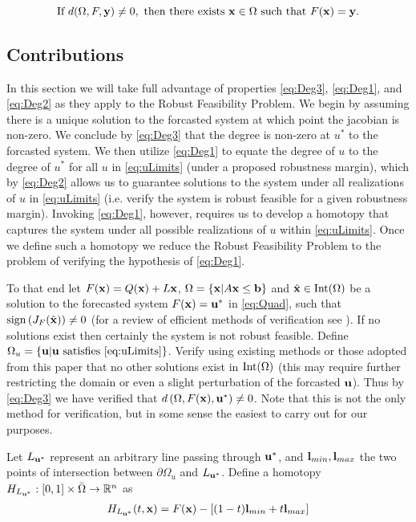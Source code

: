 \begin{equation}\label{eq:Deg2}
\text{If }d(\Omega,F,\mathbf{y})\neq 0,\text{ then there exists }\mathbf{x}\in\Omega\text{ such that }F(\mathbf{x})=\mathbf{y}. 
\end{equation}

\subsection{Contributions}
In this section we will take full advantage of properties \ref{eq:Deg3}, \ref{eq:Deg1}, and \ref{eq:Deg2} as they apply to the Robust Feasibility Problem.
We begin by assuming there is a unique solution to the forcasted system at which point the jacobian is non-zero.
We conclude by \ref{eq:Deg3} that the degree is non-zero at $u^*$ to the forcasted system. 
We then utilize \ref{eq:Deg1} to equate the degree of $u$ to the degree of $u^*$ for all $u$ in \ref{eq:uLimits} (under a proposed robustness margin), which by \ref{eq:Deg2} allows us to guarantee solutions to the system under all realizations of $u$ in \ref{eq:uLimits} (i.e. verify the system is robust feasible for a given robustness margin).
Invoking \ref{eq:Deg1}, however, requires us to develop a homotopy that captures the system under all possible realizations of $u$ within \ref{eq:uLimits}.
Once we define such a homotopy we reduce the Robust Feasibility Problem to the problem of verifying the hypothesis of \ref{eq:Deg1}. 

To that end let $F(\mathbf{x})=Q(\mathbf{x})+L\mathbf{x}$, $\Omega=\{\mathbf{x}| A\mathbf{x} \leq \mathbf{b}\}$ and $\hat{\mathbf{x}}\in \operatorname{Int}(\Omega)$ be a solution to the forecasted system $F(\mathbf{x})=\mathbf{u}^*$ in \ref{eq:Quad}, such that $\operatorname{sign}\left(J_{F}(\hat{\mathbf{x}})\right)\neq 0$ (for a review of efficient methods of verification see \cite{GRIEWANK2014}). 
If no solutions exist then certainly the system is not robust feasible. Define $\Omega_u=\{\mathbf{u}| \mathbf{u}\text{ satisfies }\ref{eq:uLimits}\}$.
Verify using existing methods or those adopted from this paper that no other solutions exist in $\operatorname{Int}(\Omega)$ (this may require further restricting the domain or even a slight perturbation of the forcasted $\mathbf{u}$). 
Thus by \ref{eq:Deg3} we have verified that $d\left(\Omega, F(\mathbf{x}), \mathbf{u}^*\right)\neq 0$. 
Note that this is not the only method for verification, but in some sense the easiest to carry out for our purposes. 

Let $L_{\mathbf{u}^*}$ represent an arbitrary line passing through $\mathbf{u}^*$, and $\mathbf{l}_{min},\mathbf{l}_{max}$ the two points of intersection between $\partial\Omega_u$ and $L_{\mathbf{u}^*}$. 
Define a homotopy $H_{L_{\mathbf{u}^*}} : [0,1]\times\bar{\Omega}\rightarrow\mathbb{R}^n$ as 
\begin{align}
H_{L_{\mathbf{u}^*}}(t,\mathbf{x}) = F(\mathbf{x})-\left[(1-t)\mathbf{l}_{min}+t\mathbf{l}_{max}\right] \label{eq:Homo}
\end{align}

